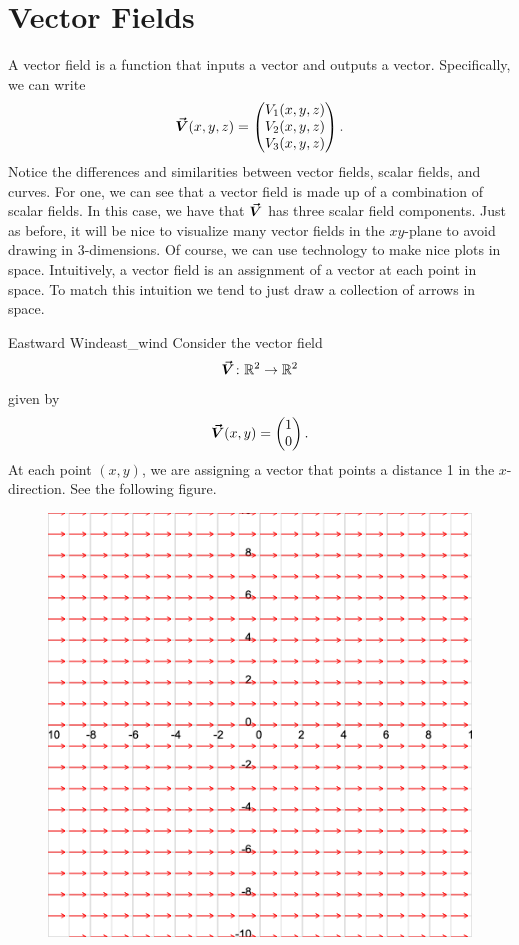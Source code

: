 \section{Vector Fields}
                
                A vector field is a function that inputs a vector and outputs a vector. Specifically, we can write
                \[
                \boldsymbol{\vec{V}}(x,y,z)=\begin{pmatrix} V_1(x,y,z)\\ V_2(x,y,z) \\ V_3(x,y,z)\end{pmatrix}.
                \]
                Notice the differences and similarities between vector fields, scalar fields, and curves.  For one, we can see that a vector field is made up of a combination of scalar fields.  In this case, we have that $\boldsymbol{\vec{V}}$ has three scalar field components.  Just as before, it will be nice to visualize many vector fields in the $xy$-plane to avoid drawing in 3-dimensions. Of course, we can use technology to make nice plots in space. Intuitively, a vector field is an assignment of a vector at each point in space.  To match this intuition we tend to just draw a collection of arrows in space.
                
                \begin{ex}{Eastward Wind}{east_wind}
                Consider the vector field
                \[
                \boldsymbol{\vec{V}}\colon \mathbb{R}^2 \to \mathbb{R}^2
                \]
                given by
                \[
                \boldsymbol{\vec{V}}(x,y)=\begin{pmatrix} 1 \\ 0 \end{pmatrix}.
                \]
                At each point $(x,y)$, we are assigning a vector that points a distance 1 in the $x$-direction. See the following figure.
                \begin{figure}[H]
                    \centering
                    \includegraphics[width=.6\textwidth]{Figures_Part_6/wind_field.png}
                \end{figure}
                \end{ex}
                
